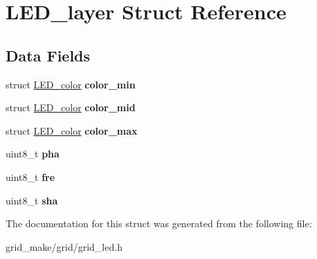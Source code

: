 \hypertarget{structLED__layer}{\section{L\-E\-D\-\_\-layer Struct Reference}
\label{structLED__layer}
}
\subsection*{Data Fields}
\begin{DoxyCompactItemize}
\item 
\hypertarget{structLED__layer_a322d9b111e789898eedfd9f7f90b8582}{struct \hyperlink{structLED__color}{L\-E\-D\-\_\-color} {\bfseries color\-\_\-min}}\label{structLED__layer_a322d9b111e789898eedfd9f7f90b8582}

\item 
\hypertarget{structLED__layer_a3b268ee704e7bfa27f341c6790ffcdeb}{struct \hyperlink{structLED__color}{L\-E\-D\-\_\-color} {\bfseries color\-\_\-mid}}\label{structLED__layer_a3b268ee704e7bfa27f341c6790ffcdeb}

\item 
\hypertarget{structLED__layer_a637a29dfccc5083d3a39a928f7467d66}{struct \hyperlink{structLED__color}{L\-E\-D\-\_\-color} {\bfseries color\-\_\-max}}\label{structLED__layer_a637a29dfccc5083d3a39a928f7467d66}

\item 
\hypertarget{structLED__layer_a6687ed1ee8d90e54e30c7536176092ec}{uint8\-\_\-t {\bfseries pha}}\label{structLED__layer_a6687ed1ee8d90e54e30c7536176092ec}

\item 
\hypertarget{structLED__layer_a1819c50da1452d2b705c2771ed1e9043}{uint8\-\_\-t {\bfseries fre}}\label{structLED__layer_a1819c50da1452d2b705c2771ed1e9043}

\item 
\hypertarget{structLED__layer_a5fabb55c796c6d4c8ee128ae2e37e92f}{uint8\-\_\-t {\bfseries sha}}\label{structLED__layer_a5fabb55c796c6d4c8ee128ae2e37e92f}

\end{DoxyCompactItemize}


The documentation for this struct was generated from the following file\-:\begin{DoxyCompactItemize}
\item 
grid\-\_\-make/grid/grid\-\_\-led.\-h\end{DoxyCompactItemize}
